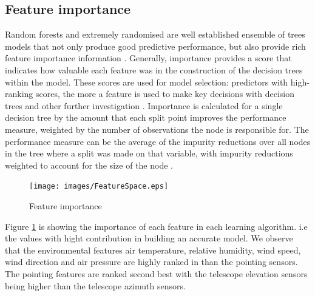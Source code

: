 \subsection{Feature importance}
Random forests and extremely randomised are well established ensemble of trees models that not only produce good predictive performance, but also provide rich feature importance information \citep{kazemitabar2017variable}. Generally, importance provides a score that indicates how  valuable each feature was in the construction of the decision trees within the model. These scores are used for model selection: predictors with high-ranking scores, the more a feature  is used to make key decisions with decision trees and other further investigation \citep{pedregosa2011scikit}. Importance is calculated for a single decision tree by the amount that each split point improves the performance measure, weighted by the number of observations the node is responsible for. The performance measure can be the average of the impurity reductions over all nodes in the tree where a split was made on that variable, with impurity reductions weighted to account for the size of the node \citep{kazemitabar2017variable}.

\begin{figure}[H]
  \centering
    \texttt{[image: images/FeatureSpace.eps]}
    \caption{Feature importance}
    \label{FI}
\end{figure}
Figure \ref{FI} is showing the importance of each feature in each learning algorithm. i.e the values with hight contribution in building an accurate model. We observe that the environmental features air temperature, relative humidity, wind speed, wind direction and air pressure are highly ranked in than the pointing sensors. The pointing features are ranked second best with the telescope elevation sensors being higher than the telescope azimuth sensors. 

